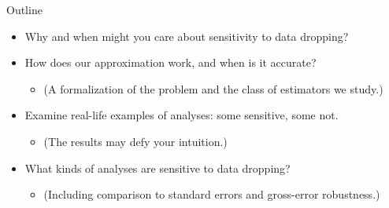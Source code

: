 

\begin{frame}{Outline}
\begin{itemize}
    \item Why and when might you care about sensitivity to data dropping?
    \item How does our approximation work, and when is it accurate?
    \begin{itemize}
        \item[] (A formalization of the problem and the
            class of estimators we study.)
    \end{itemize}
    \item Examine real-life examples of analyses: some sensitive, some not.
    \begin{itemize}
        \item[] (The results may defy your intuition.)
    \end{itemize}
    \item What kinds of analyses are sensitive to data dropping?
    \begin{itemize}
        \item[] (Including comparison to standard errors and
            gross-error robustness.)
    \end{itemize}
\end{itemize}
\end{frame}


